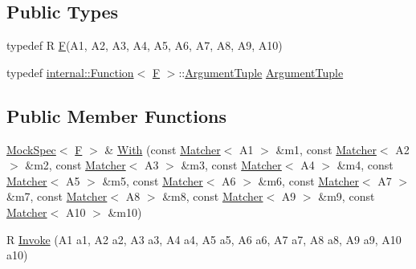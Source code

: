 \subsection*{Public Types}
\begin{DoxyCompactItemize}
\item 
typedef R \hyperlink{classtesting_1_1internal_1_1FunctionMocker_3_01R_07A1_00_01A2_00_01A3_00_01A4_00_01A5_00_01A6_0079295c90ba14a714e84d5a856a5b50dd_a2d90d01f106c17651d836bc1c00789f6}{F}(A1, A2, A3, A4, A5, A6, A7, A8, A9, A10)
\item 
typedef \hyperlink{structtesting_1_1internal_1_1Function}{internal\+::\+Function}$<$ \hyperlink{classtesting_1_1internal_1_1FunctionMocker_3_01R_07A1_00_01A2_00_01A3_00_01A4_00_01A5_00_01A6_0079295c90ba14a714e84d5a856a5b50dd_a2d90d01f106c17651d836bc1c00789f6}{F} $>$\+::\hyperlink{classtesting_1_1internal_1_1FunctionMocker_3_01R_07A1_00_01A2_00_01A3_00_01A4_00_01A5_00_01A6_0079295c90ba14a714e84d5a856a5b50dd_ac485428e5208eda1dbc15df996f9f81d}{Argument\+Tuple} \hyperlink{classtesting_1_1internal_1_1FunctionMocker_3_01R_07A1_00_01A2_00_01A3_00_01A4_00_01A5_00_01A6_0079295c90ba14a714e84d5a856a5b50dd_ac485428e5208eda1dbc15df996f9f81d}{Argument\+Tuple}
\end{DoxyCompactItemize}
\subsection*{Public Member Functions}
\begin{DoxyCompactItemize}
\item 
\hyperlink{classtesting_1_1internal_1_1MockSpec}{Mock\+Spec}$<$ \hyperlink{classtesting_1_1internal_1_1FunctionMocker_3_01R_07A1_00_01A2_00_01A3_00_01A4_00_01A5_00_01A6_0079295c90ba14a714e84d5a856a5b50dd_a2d90d01f106c17651d836bc1c00789f6}{F} $>$ \& \hyperlink{classtesting_1_1internal_1_1FunctionMocker_3_01R_07A1_00_01A2_00_01A3_00_01A4_00_01A5_00_01A6_0079295c90ba14a714e84d5a856a5b50dd_a30238afadc5c348acff39f601fadc786}{With} (const \hyperlink{classtesting_1_1Matcher}{Matcher}$<$ A1 $>$ \&m1, const \hyperlink{classtesting_1_1Matcher}{Matcher}$<$ A2 $>$ \&m2, const \hyperlink{classtesting_1_1Matcher}{Matcher}$<$ A3 $>$ \&m3, const \hyperlink{classtesting_1_1Matcher}{Matcher}$<$ A4 $>$ \&m4, const \hyperlink{classtesting_1_1Matcher}{Matcher}$<$ A5 $>$ \&m5, const \hyperlink{classtesting_1_1Matcher}{Matcher}$<$ A6 $>$ \&m6, const \hyperlink{classtesting_1_1Matcher}{Matcher}$<$ A7 $>$ \&m7, const \hyperlink{classtesting_1_1Matcher}{Matcher}$<$ A8 $>$ \&m8, const \hyperlink{classtesting_1_1Matcher}{Matcher}$<$ A9 $>$ \&m9, const \hyperlink{classtesting_1_1Matcher}{Matcher}$<$ A10 $>$ \&m10)
\item 
R \hyperlink{classtesting_1_1internal_1_1FunctionMocker_3_01R_07A1_00_01A2_00_01A3_00_01A4_00_01A5_00_01A6_0079295c90ba14a714e84d5a856a5b50dd_a5ddc0163e96a8c644059f562dfa2cd4b}{Invoke} (A1 a1, A2 a2, A3 a3, A4 a4, A5 a5, A6 a6, A7 a7, A8 a8, A9 a9, A10 a10)
\end{DoxyCompactItemize}
